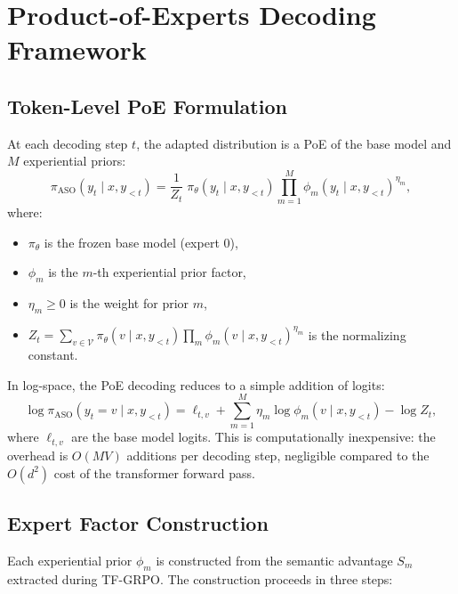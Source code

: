 \section{Product-of-Experts Decoding Framework}

\label{sec:poe}

\subsection{Token-Level PoE Formulation}

At each decoding step $t$, the adapted distribution is a PoE of the base model
and $M$ experiential priors:
\begin{equation}
    \pi_{\text{ASO}}(y_t \mid x, y_{<t})
    = \frac{1}{Z_t} \; \pi_\theta(y_t \mid x, y_{<t})
    \prod_{m=1}^{M} \phi_m(y_t \mid x, y_{<t})^{\eta_m},
    \label{eq:poe-main}
\end{equation}
where:
\begin{itemize}[leftmargin=1.5em]
    \item $\pi_\theta$ is the frozen base model (expert 0),
    \item $\phi_m$ is the $m$-th experiential prior factor,
    \item $\eta_m \geq 0$ is the weight for prior $m$,
    \item $Z_t = \sum_{v \in \mathcal{V}} \pi_\theta(v \mid x, y_{<t})
          \prod_m \phi_m(v \mid x, y_{<t})^{\eta_m}$ is the normalizing constant.
\end{itemize}

In log-space, the PoE decoding reduces to a simple addition of logits:
\begin{equation}
    \log \pi_{\text{ASO}}(y_t = v \mid x, y_{<t})
    = \ell_{t,v} + \sum_{m=1}^{M} \eta_m \log \phi_m(v \mid x, y_{<t}) - \log Z_t,
    \label{eq:poe-logspace}
\end{equation}
where $\ell_{t,v}$ are the base model logits. This is computationally
inexpensive: the overhead is $O(MV)$ additions per decoding step, negligible
compared to the $O(d^2)$ cost of the transformer forward pass.

\subsection{Expert Factor Construction}

Each experiential prior $\phi_m$ is constructed from the semantic advantage
$S_m$ extracted during TF-GRPO. The construction proceeds in three steps:

